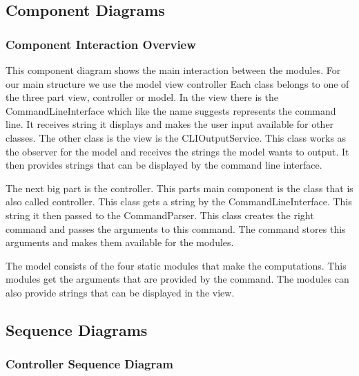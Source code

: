 \documentclass[parskip=full]{scrartcl}
\begin{document}
\subsection{Component Diagrams}

\subsubsection{Component Interaction Overview}



This component diagram shows the main interaction between the modules.
For our main structure we use the model view controller 
Each class belongs to one of the three part view, controller or model.
In the view there is the CommandLineInterface which like the name suggests represents the command line. 
It receives string it displays and makes the user input available for other classes.
The other class is the view is the CLIOutputService. 
This class works as the observer for the model and receives the strings the model wants to output.
It then provides strings that can be displayed by the command line interface.

The next big part is the controller.
This parts main component is the class that is also called controller.
This class gets a string by the CommandLineInterface.
This string it then passed to the CommandParser.
This class creates the right command and passes the arguments to this command.
The command stores this arguments and makes them available for the modules.

The model consists of the four static modules that make the computations.
This modules get the arguments that are provided by the command.
The modules can also provide strings that can be displayed in the view.

\subsection{Sequence Diagrams}

\subsubsection{Controller Sequence Diagram}


\end{document}
